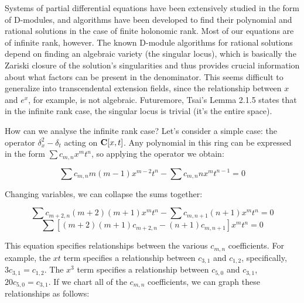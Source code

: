 \documentclass{article}
\newcommand{\C}{\ensuremath{{\bf C}}}
\begin{document}
Systems of partial differential equations have been extensively
studied in the form of D-modules, and algorithms have been developed
to find their polynomial and rational solutions in the case of finite
holonomic rank.  Most of our equations are of infinite rank, however.
The known D-module algorithms for rational solutions depend on finding
an algebraic variety (the singular locus), which is basically the
Zariski closure of the solution's singularities and thus provides
crucial information about what factors can be present in the
denominator.  This seems difficult to generalize into transcendental
extension fields, since the relationship between $x$ and $e^x$, for
example, is not algebraic.  Futuremore, Tsai's Lemma 2.1.5 states that in
the infinite rank case, the singular locus is trivial (it's the entire space).

How can we analyse the infinite rank case?  Let's consider a simple
case: the operator $\delta_x^2 - \delta_t$ acting on $\C[x,t]$.
Any polynomial in this ring can be expressed in the form $\sum c_{m,n} x^m t^n$,
so applying the operator we obtain:

$$\sum c_{m,n} m(m-1) x^{m-2} t^n - \sum c_{m,n} n x^m t^{n-1} = 0$$

Changing variables, we can collapse the sums together:

$$\sum c_{m+2,n} (m+2)(m+1) x^m t^n - \sum c_{m,n+1} (n+1) x^m t^n = 0$$
$$\sum \left[  (m+2)(m+1) c_{m+2,n} -  (n+1) c_{m,n+1} \right] x^m t^n = 0$$

This equation specifies relationships between the various $c_{m,n}$
coefficients.  For example, the $xt$ term specifies a relationship
between $c_{3,1}$ and $c_{1,2}$, specifically, $3c_{3,1}=c_{1,2}$.
The $x^3$ term specifies a relationship between $c_{5,0}$ and $c_{3,1}$,
$20c_{5,0} = c_{3,1}$.
If we chart all of the $c_{m,n}$ coefficients, we can graph these
relationships as follows:

\def\tikzcoefficientgraph{
\pgftransformscale{0.5}
\foreach \x in {0,...,5}
   \foreach \y in {0,...,5}
      \draw (\x,\y) node {.};

\foreach \x in {2,...,5}
   \draw (\x,-1) node [anchor=base] {$x^\x$};
\draw (1,-1) node [anchor=base] {$x$};
\draw (0,-1) node [anchor=base] {1};
\foreach \y in {2,...,5}
   \draw (-0.5,\y) node {$t^\y$};
\draw (-0.5,1) node {$t$};
\draw (-0.5,0) node {1};
}

\begin{center}
\end{center}
\end{document}
